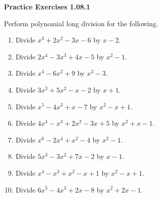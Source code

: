 \vspace{0.3ex}
\noindent\textbf{Practice Exercises 1.08.1}

\vspace{0.2ex}

Perform polynomial long division for the following.
\begin{enumerate}
    \item Divide \(x^3 + 2x^2 - 3x - 6\) by \(x - 2\).
    \item Divide \(2x^4 - 3x^3 + 4x - 5\) by \(x^2 - 1\).
    \item Divide \(x^4 - 6x^2 + 9\) by \(x^2 - 3\).
    \item Divide \(3x^3 + 5x^2 - x - 2\) by \(x + 1\).
    \item Divide \(x^5 - 4x^3 + x - 7\) by \(x^2 - x + 1\).
    \item Divide \(4x^4 - x^3 + 2x^2 - 3x + 5\) by \(x^2 + x - 1\).
    \item Divide \(x^6 - 2x^4 + x^2 - 4\) by \(x^2 - 1\).
    \item Divide \(5x^3 - 3x^2 + 7x - 2\) by \(x - 1\).
    \item Divide \(x^4 - x^3 + x^2 - x + 1\) by \(x^2 - x + 1\).
    \item Divide \(6x^5 - 4x^3 + 2x - 8\) by \(x^2 + 2x - 1\).
\end{enumerate}
